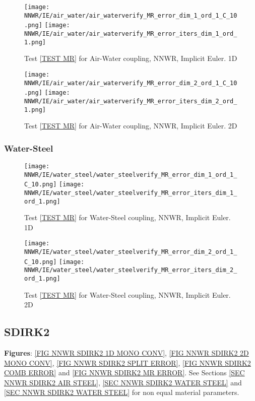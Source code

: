 \documentclass[a4paper,10pt]{article}
\begin{document}
\begin{figure}[!ht]
\texttt{[image: NNWR/IE/air\_water/air\_waterverify\_MR\_error\_dim\_1\_ord\_1\_C\_10.png]}
\texttt{[image: NNWR/IE/air\_water/air\_waterverify\_MR\_error\_iters\_dim\_1\_ord\_1.png]}
\caption{Test \ref{TEST MR} for Air-Water coupling, NNWR, Implicit Euler. 1D}
\label{FIG NNWR IE AIR WATER 1D}
\end{figure}

\begin{figure}[!ht]
\texttt{[image: NNWR/IE/air\_water/air\_waterverify\_MR\_error\_dim\_2\_ord\_1\_C\_10.png]}
\texttt{[image: NNWR/IE/air\_water/air\_waterverify\_MR\_error\_iters\_dim\_2\_ord\_1.png]}
\caption{Test \ref{TEST MR} for Air-Water coupling, NNWR, Implicit Euler. 2D}
\label{FIG NNWR IE AIR WATER 2D}
\end{figure}

\FloatBarrier
\subsubsection{Water-Steel}\label{SEC NNWR IE WATER STEEL}
% 

\begin{figure}[!ht]
\texttt{[image: NNWR/IE/water\_steel/water\_steelverify\_MR\_error\_dim\_1\_ord\_1\_C\_10.png]}
\texttt{[image: NNWR/IE/water\_steel/water\_steelverify\_MR\_error\_iters\_dim\_1\_ord\_1.png]}
\caption{Test \ref{TEST MR} for Water-Steel coupling, NNWR, Implicit Euler. 1D}
\label{FIG NNWR IE WATER STEEL 1D}
\end{figure}

\begin{figure}[!ht]
\texttt{[image: NNWR/IE/water\_steel/water\_steelverify\_MR\_error\_dim\_2\_ord\_1\_C\_10.png]}
\texttt{[image: NNWR/IE/water\_steel/water\_steelverify\_MR\_error\_iters\_dim\_2\_ord\_1.png]}
\caption{Test \ref{TEST MR} for Water-Steel coupling, NNWR, Implicit Euler. 2D}
\label{FIG NNWR IE WATER STEEL 2D}
\end{figure}

\FloatBarrier
\subsection{SDIRK2}\label{SEC DWNR SDIRK2}
% 
\textbf{Figures}: \ref{FIG NNWR SDIRK2 1D MONO CONV}, \ref{FIG NNWR SDIRK2 2D MONO CONV}, \ref{FIG NNWR SDIRK2 SPLIT ERROR}, \ref{FIG NNWR SDIRK2 COMB ERROR} and \ref{FIG NNWR SDIRK2 MR ERROR}. See Sections \ref{SEC NNWR SDIRK2 AIR STEEL}, \ref{SEC NNWR SDIRK2 WATER STEEL} and \ref{SEC NNWR SDIRK2 WATER STEEL} for non equal material parameters.
\end{document}
